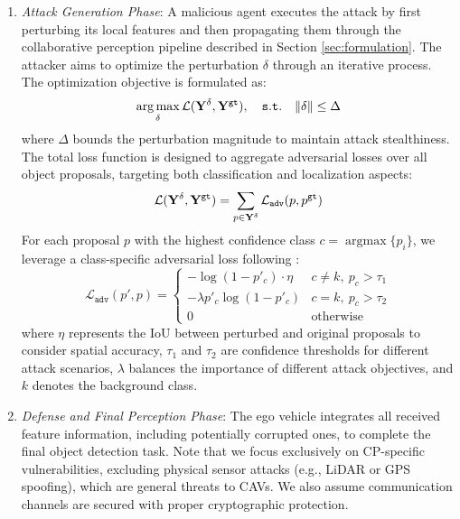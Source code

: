 \begin{enumerate}
    \item \textit{Attack Generation Phase}: A malicious agent executes the attack by first perturbing its local features and then propagating them through the collaborative perception pipeline described in Section \ref{sec:formulation}.
    The attacker aims to optimize the perturbation $\delta$ through an iterative process. The optimization objective is formulated as:
    \vspace{-1mm}
    \begin{equation}
        \vspace{-2mm}
        \begin{aligned}
        \mathop{\arg\max}_{\delta} \mathcal{L}(\mathbf{Y}^\delta, \mathbf{Y}^\mathtt{gt}),
        \quad \mathtt{s.t.}\quad  \|\delta\|\leq \Delta
        \end{aligned}
    \end{equation}
    where $\Delta$ bounds the perturbation magnitude to maintain attack stealthiness. The total loss function is designed to aggregate adversarial losses over all object proposals, targeting both classification and localization aspects:
    \vspace{-1mm}
    \begin{equation}
        \vspace{-2mm}
        \mathcal{L}(\mathbf{Y}^\delta, \mathbf{Y}^\mathtt{gt}) = \sum_{p \in \mathbf{Y}^\delta} \mathcal{L}_\mathtt{adv}(p, p^\mathtt{gt})
    \end{equation}
    For each proposal $p$ with the highest confidence class $c = \mathop{\arg\max}\{p_i\}$, we leverage a class-specific adversarial loss following \citep{tuAdversarialAttacksMultiAgent2021}:
    \begin{equation*}
        \mathcal{L}_\mathtt{adv}(p', p) = \begin{cases}
            -\log(1 - p'_c)\cdot\eta & c \neq k,\ p_c > \tau_1\\
            -\lambda p'_c\log(1 - p'_c) & c = k,\ p_c > \tau_2\\
            0 & \text{otherwise}
        \end{cases}
    \end{equation*}
    where $\eta$ represents the IoU between perturbed and original proposals to consider spatial accuracy, $\tau_1$ and $\tau_2$ are confidence thresholds for different attack scenarios, $\lambda$ balances the importance of different attack objectives, and $k$ denotes the background class.

    \item \textit{Defense and Final Perception Phase}: The ego vehicle integrates all received feature information, including potentially corrupted ones, to complete the final object detection task. Note that we focus exclusively on CP-specific vulnerabilities, excluding physical sensor attacks (e.g., LiDAR or GPS spoofing), which are general threats to CAVs. We also assume communication channels are secured with proper cryptographic protection.
\end{enumerate}
